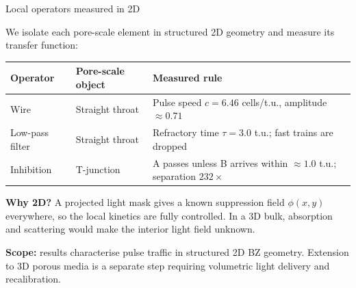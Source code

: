 \documentclass[aspectratio=169,11pt]{beamer}
\begin{document}
\begin{frame}{Local operators measured in 2D}

We isolate each pore-scale element in structured 2D geometry and measure its transfer function:

\vspace{0.3cm}
\begin{table}
\centering
\footnotesize
\begin{tabular}{p{2.8cm}p{3.5cm}p{6.5cm}}
\toprule
\textbf{Operator} & \textbf{Pore-scale object} & \textbf{Measured rule} \\
\midrule
Wire & Straight throat & Pulse speed $c = 6.46$ cells/t.u., amplitude $\approx 0.71$ \\
Low-pass filter & Straight throat & Refractory time $\tau = 3.0$ t.u.; fast trains are dropped \\
Inhibition & T-junction & A passes unless B arrives within $\approx 1.0$ t.u.; separation $232\times$ \\
\bottomrule
\end{tabular}
\end{table}

\vspace{0.3cm}
\textbf{Why 2D?} A projected light mask gives a known suppression field $\phi(x,y)$ everywhere, so the local kinetics are fully controlled. In a 3D bulk, absorption and scattering would make the interior light field unknown.

\vspace{0.3cm}
\textbf{Scope:} results characterise pulse traffic in structured 2D BZ geometry. Extension to 3D porous media is a separate step requiring volumetric light delivery and recalibration.

\end{frame}
\end{document}
